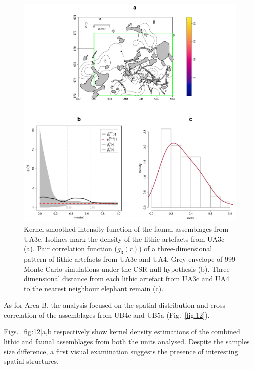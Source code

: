 \documentclass[preprint,authoryear,times]{elsarticle} %
\begin{document}
\begin{figure}[]
  \centering
  \includegraphics[width=1\textwidth]{../artwork/Fig11.pdf}
  \caption{Kernel smoothed intensity function of the faunal assemblages from UA3c. Isolines mark the density of the lithic artefacts from UA3c (a). Pair correlation function ($g_3(r)$) of a three-dimensional pattern of lithic artefacts from UA3c and UA4. Grey envelope of 999 Monte Carlo simulations under the CSR null hypothesis (b). Three-dimensional distance from each lithic artefact from UA3c and UA4 to the nearest neighbour elephant remain (c).}
  \label{fig:11}
\end{figure}


As for Area B, the analysis focused on the spatial distribution and cross-correlation of the assemblages from UB4c and UB5a (Fig.~\ref{fig:12}). %

Figs.~\ref{fig:12}a,b respectively show kernel density estimations of the combined lithic and faunal assemblages from both the units analysed. Despite the samples size difference, a first visual examination suggests the presence of interesting spatial structures.
\end{document}
